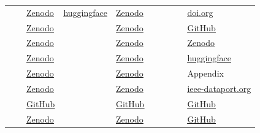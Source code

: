 \begin{tabular} { p{} p{} p{} p{} p{}  | p{} p{} p{} p{} p{}  }
\cite{ \papereightyseventh } &  & \href{https://zenodo.org/records/13342040}{\underline{Zenodo}} & \href{https://huggingface.co/angeloc1}{\underline{huggingface}} & \href{https://zenodo.org/records/13342040}{\underline{Zenodo}} & \cite{ \paperfiftythird } &  &  &  & \href{http://doi.org/10.6084/m9.figshare.25434550}{\underline{doi.org}}\\ 
\cite{ \papersixteenth } &  & \href{https://zenodo.org/records/15223349}{\underline{Zenodo}} &  & \href{https://zenodo.org/records/15223349}{\underline{Zenodo}} & \cite{ \papersixtieth } &  &  &  & \href{https://github.com/scx-othr/mdeintelligence24-shop-example/tree/main/src/valkyrie}{\underline{GitHub}}\\ 
\cite{ \paperthirtysixth } &  & \href{https://zenodo.org/records/13882605}{\underline{Zenodo}} &  & \href{https://zenodo.org/records/13882605}{\underline{Zenodo}} & \cite{ \paperseventythird } &  &  &  & \href{https://zenodo.org/records/10532601}{\underline{Zenodo}}\\ 
\cite{ \paperfortyfirst } &  & \href{https://zenodo.org/records/13513891}{\underline{Zenodo}} &  & \href{https://zenodo.org/records/13513891}{\underline{Zenodo}} & \cite{ \paperseventyeighth } &  &  &  & \href{https://huggingface.co/datasets/fpan/text-to-ocl-from-ecore}{\underline{huggingface}}\\ 
\cite{ \paperseventyseventh } &  & \href{https://zenodo.org/records/12740518}{\underline{Zenodo}} &  & \href{https://zenodo.org/records/12740518}{\underline{Zenodo}} & \cite{ \papereightysixth } &  &  &  & Appendix\\ 
\cite{ \papereightysecond } &  & \href{https://zenodo.org/records/10606441}{\underline{Zenodo}} &  & \href{https://zenodo.org/records/10606441}{\underline{Zenodo}} & \cite{ \papereightyninth } &  &  &  & \href{https://ieee-dataport.org/documents/dataset-text-requirements-models}{\underline{ieee-dataport.org}}\\ 
\cite{ \paperonehundredth } &  & \href{https://github.com/BPMN-Chatbot/bpmn-chatbot-archive}{\underline{GitHub}} &  & \href{https://github.com/BPMN-Chatbot/bpmn-chatbot-archive}{\underline{GitHub}} & \cite{ \paperninetyfifth } &  &  &  & \href{https://github.com/humam-kourani/LLM-Process-Modeling}{\underline{GitHub}}\\ 
\cite{ \paperonehundredsixth } &  & \href{https://zenodo.org/records/10841786}{\underline{Zenodo}} &  & \href{https://zenodo.org/records/10841786}{\underline{Zenodo}} & \cite{ \paperninetysixth } &  &  &  & \href{https://github.com/fgs-fgs/BusinessModelPrompt}{\underline{GitHub}}\\ 

\end{tabular}
